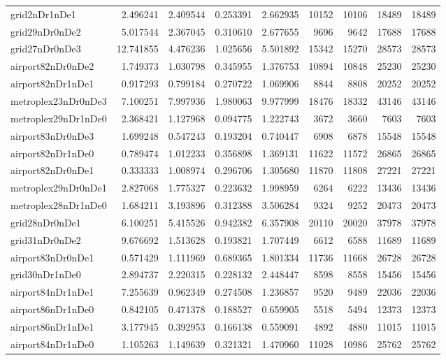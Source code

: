 \begin{longtable}{|l|r|r|r|r|r|r|r|r|}
grid2nDr1nDe1 & 2.496241 & 2.409544 & 0.253391 & 2.662935 & 10152 & 10106 & 18489 & 18489 \\
grid29nDr0nDe2 & 5.017544 & 2.367045 & 0.310610 & 2.677655 & 9696 & 9642 & 17688 & 17688 \\
grid27nDr0nDe3 & 12.741855 & 4.476236 & 1.025656 & 5.501892 & 15342 & 15270 & 28573 & 28573 \\
airport82nDr0nDe2 & 1.749373 & 1.030798 & 0.345955 & 1.376753 & 10894 & 10848 & 25230 & 25230 \\
airport82nDr1nDe1 & 0.917293 & 0.799184 & 0.270722 & 1.069906 & 8844 & 8808 & 20252 & 20252 \\
metroplex23nDr0nDe3 & 7.100251 & 7.997936 & 1.980063 & 9.977999 & 18476 & 18332 & 43146 & 43146 \\
metroplex29nDr1nDe0 & 2.368421 & 1.127968 & 0.094775 & 1.222743 & 3672 & 3660 & 7603 & 7603 \\
airport83nDr0nDe3 & 1.699248 & 0.547243 & 0.193204 & 0.740447 & 6908 & 6878 & 15548 & 15548 \\
airport82nDr1nDe0 & 0.789474 & 1.012233 & 0.356898 & 1.369131 & 11622 & 11572 & 26865 & 26865 \\
airport82nDr0nDe1 & 0.333333 & 1.008974 & 0.296706 & 1.305680 & 11870 & 11808 & 27221 & 27221 \\
metroplex29nDr0nDe1 & 2.827068 & 1.775327 & 0.223632 & 1.998959 & 6264 & 6222 & 13436 & 13436 \\
metroplex28nDr1nDe0 & 1.684211 & 3.193896 & 0.312388 & 3.506284 & 9324 & 9252 & 20473 & 20473 \\
grid28nDr0nDe1 & 6.100251 & 5.415526 & 0.942382 & 6.357908 & 20110 & 20020 & 37978 & 37978 \\
grid31nDr0nDe2 & 9.676692 & 1.513628 & 0.193821 & 1.707449 & 6612 & 6588 & 11689 & 11689 \\
airport83nDr0nDe1 & 0.571429 & 1.111969 & 0.689365 & 1.801334 & 11736 & 11668 & 26728 & 26728 \\
grid30nDr1nDe0 & 2.894737 & 2.220315 & 0.228132 & 2.448447 & 8598 & 8558 & 15456 & 15456 \\
airport84nDr1nDe1 & 7.255639 & 0.962349 & 0.274508 & 1.236857 & 9520 & 9489 & 22036 & 22036 \\
airport86nDr1nDe0 & 0.842105 & 0.471378 & 0.188527 & 0.659905 & 5518 & 5494 & 12373 & 12373 \\
airport86nDr1nDe1 & 3.177945 & 0.392953 & 0.166138 & 0.559091 & 4892 & 4880 & 11015 & 11015 \\
airport84nDr1nDe0 & 1.105263 & 1.149639 & 0.321321 & 1.470960 & 11028 & 10986 & 25762 & 25762 \\

\end{longtable}
